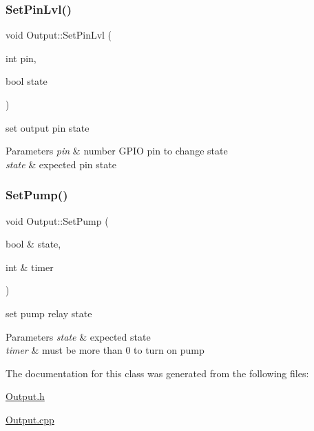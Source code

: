 \subsubsection{\texorpdfstring{Set\+Pin\+Lvl()}{SetPinLvl()}}
{\footnotesize\ttfamily void Output\+::\+Set\+Pin\+Lvl (\begin{DoxyParamCaption}\item[{int}]{pin,  }\item[{bool}]{state }\end{DoxyParamCaption})\hspace{0.3cm}{\ttfamily [private]}}



set output pin state 


\begin{DoxyParams}{Parameters}
{\em pin} & number G\+P\+IO pin to change state \\
\hline
{\em state} & expected pin state \\
\hline
\end{DoxyParams}
\mbox{\label{class_output_a3d0ab08436b9c18861a2ae060f0aec88}} 
\subsubsection{\texorpdfstring{Set\+Pump()}{SetPump()}}
{\footnotesize\ttfamily void Output\+::\+Set\+Pump (\begin{DoxyParamCaption}\item[{bool \&}]{state,  }\item[{int \&}]{timer }\end{DoxyParamCaption})}



set pump relay state 


\begin{DoxyParams}{Parameters}
{\em state} & expected state \\
\hline
{\em timer} & must be more than 0 to turn on pump \\
\hline
\end{DoxyParams}


The documentation for this class was generated from the following files\+:\begin{DoxyCompactItemize}
\item 
\hyperlink{_output_8h}{Output.\+h}\item 
\hyperlink{_output_8cpp}{Output.\+cpp}\end{DoxyCompactItemize}
